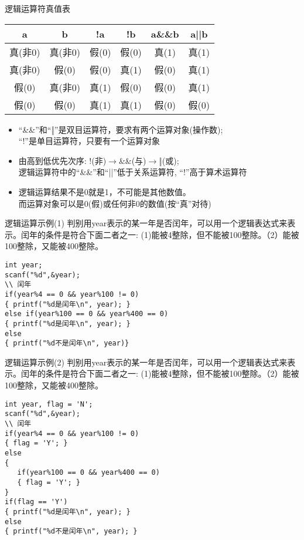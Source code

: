 \begin{frame}{逻辑运算符真值表}
\begin{tabular}{|c|c||c|c|c|c|}
\hline 
a       & b      & !a    & !b    & a\&\&b & a||b \\ 
\hline 
真(非0) & 真(非0) & 假(0) & 假(0) & 真(1)  & 真(1) \\ 
\hline
真(非0) & 假(0)   & 假(0) & 真(1) & 假(0)  & 真(1) \\ 
\hline 
假(0)   & 真(非0) & 真(1) & 假(0) & 假(0)  & 真(1) \\ 
\hline 
假(0)   & 假(0)   & 真(1) & 真(1) & 假(0)  & 假(0) \\ 
\hline  
\end{tabular} 
\begin{itemize}
	\item ``\&\&''和``‖''是双目运算符，要求有两个运算对象(操作数);\\ ``!''是单目运算符，只要有一个运算对象
	\item 由高到低优先次序: !(非)$\to$\&\&(与)$\to$‖(或);\\
          逻辑运算符中的``\&\&''和``||''低于关系运算符, ``!''高于算术运算符
	\item 逻辑运算结果不是0就是1，不可能是其他数值。\\
	      而运算对象可以是0(假)或任何非0的数值(按``真''对待)
\end{itemize}
\end{frame}

\begin{frame}{逻辑运算示例(1)}
判别用year表示的某一年是否闰年，可以用一个逻辑表达式来表示。闰年的条件是符合下面二者之一: (1)能被4整除，但不能被100整除。（2）能被100整除，又能被400整除。
\begin{lstlisting}
int year;
scanf("%d",&year);
\\ 闰年
if(year%4 == 0 && year%100 != 0)
{ printf("%d是闰年\n", year); }
else if(year%100 == 0 && year%400 == 0)
{ printf("%d是闰年\n", year); }
else
{ printf("%d不是闰年\n", year)}
\end{lstlisting}
\end{frame}

\begin{frame}{逻辑运算示例(2)}
判别用year表示的某一年是否闰年，可以用一个逻辑表达式来表示。闰年的条件是符合下面二者之一: (1)能被4整除，但不能被100整除。（2）能被100整除，又能被400整除。
\begin{lstlisting}
int year, flag = 'N';
scanf("%d",&year);
\\ 闰年
if(year%4 == 0 && year%100 != 0)
{ flag = 'Y'; }
else
{ 
   if(year%100 == 0 && year%400 == 0)
   { flag = 'Y'; }
}
if(flag == 'Y') 
{ printf("%d是闰年\n", year); }
else
{ printf("%d不是闰年\n", year); }
\end{lstlisting}
\end{frame}

